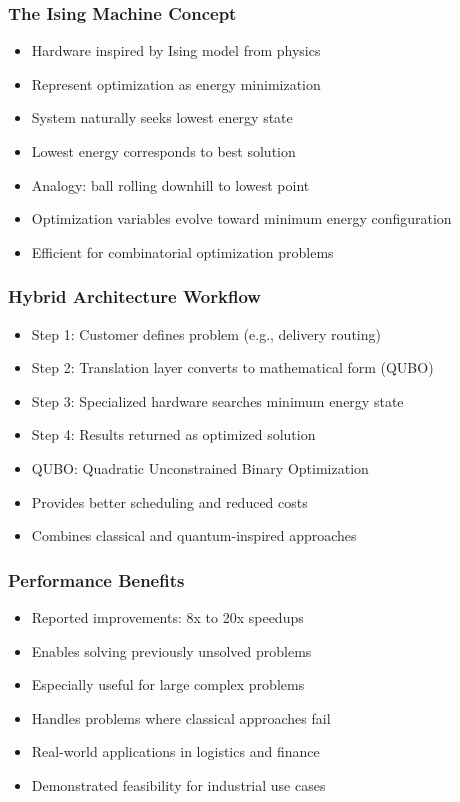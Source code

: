 \begin{frame}[fragile]\frametitle{The Ising Machine Concept}
\begin{itemize}
\item Hardware inspired by Ising model from physics
\item Represent optimization as energy minimization
\item System naturally seeks lowest energy state
\item Lowest energy corresponds to best solution
\item Analogy: ball rolling downhill to lowest point
\item Optimization variables evolve toward minimum energy configuration
\item Efficient for combinatorial optimization problems
\end{itemize}
\end{frame}

\begin{frame}[fragile]\frametitle{Hybrid Architecture Workflow}
\begin{itemize}
\item Step 1: Customer defines problem (e.g., delivery routing)
\item Step 2: Translation layer converts to mathematical form (QUBO)
\item Step 3: Specialized hardware searches minimum energy state
\item Step 4: Results returned as optimized solution
\item QUBO: Quadratic Unconstrained Binary Optimization
\item Provides better scheduling and reduced costs
\item Combines classical and quantum-inspired approaches
\end{itemize}
\end{frame}

\begin{frame}[fragile]\frametitle{Performance Benefits}
\begin{itemize}
\item Reported improvements: 8x to 20x speedups
\item Enables solving previously unsolved problems
\item Especially useful for large complex problems
\item Handles problems where classical approaches fail
\item Real-world applications in logistics and finance
\item Demonstrated feasibility for industrial use cases
\end{itemize}
\end{frame}

